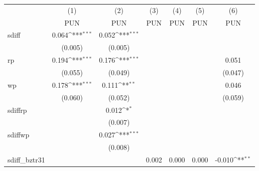 {
\def\sym#1{\ifmmode^{#1}\else\(^{#1}\)\fi}
\begin{tabular}{l*{6}{c}}
\hline\hline
                    &\multicolumn{1}{c}{(1)}&\multicolumn{1}{c}{(2)}&\multicolumn{1}{c}{(3)}&\multicolumn{1}{c}{(4)}&\multicolumn{1}{c}{(5)}&\multicolumn{1}{c}{(6)}\\
                    &\multicolumn{1}{c}{PUN}&\multicolumn{1}{c}{PUN}&\multicolumn{1}{c}{PUN}&\multicolumn{1}{c}{PUN}&\multicolumn{1}{c}{PUN}&\multicolumn{1}{c}{PUN}\\
\hline
sdiff               &       0.064\sym{***}&       0.052\sym{***}&                     &                     &                     &                     \\
                    &     (0.005)         &     (0.005)         &                     &                     &                     &                     \\
[1em]
rp                  &       0.194\sym{***}&       0.176\sym{***}&                     &                     &                     &       0.051         \\
                    &     (0.055)         &     (0.049)         &                     &                     &                     &     (0.047)         \\
[1em]
wp                  &       0.178\sym{***}&       0.111\sym{**} &                     &                     &                     &       0.046         \\
                    &     (0.060)         &     (0.052)         &                     &                     &                     &     (0.059)         \\
[1em]
sdiffrp             &                     &       0.012\sym{*}  &                     &                     &                     &                     \\
                    &                     &     (0.007)         &                     &                     &                     &                     \\
[1em]
sdiffwp             &                     &       0.027\sym{***}&                     &                     &                     &                     \\
                    &                     &     (0.008)         &                     &                     &                     &                     \\
[1em]
sdiff\_bztr31        &                     &                     &       0.002         &       0.000         &       0.000         &      -0.010\sym{**} \\

\end{tabular}}
